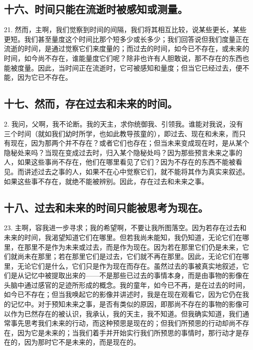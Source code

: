 
\subsection{十六、时间只能在流逝时被感知或测量。}

21. 然而，主啊，我们觉察到时间的间隔，我们将其相互比较，说某些更长，某些更短。我们甚至量度这个时间比那个短多少或长多少；我们回答说但我们度量正在流逝的时间，是通过觉察它们来度量的；而过去的时间，如今已不存在，或未来的时间，如今尚不存在，谁能量度它们呢？除非也许有人胆敢说，那不存在的东西也能被度量。因此，当时间正在流逝时，它可被感知和量度；但当它已经过去，便不能，因为它已不存在。\par


\subsection{十七、然而，存在过去和未来的时间。}

2. 我问，父啊，我不论断。我的天主，求你统御我、引领我。谁能对我说，没有三个时间（就如我们幼时所学，也如此教导孩童的），即过去、现在和未来，而只有现在，因为那两个并不存在？或者它们也存在；但当未来变成现在时，是从某个隐秘处来吗？当现在变成过去时，归入某个隐秘处吗？因为那些预言未来之事的人，如果这些事尚不存在，他们在哪里看见了它们？因为不存在的东西不能被看见。而讲述过去之事的人，如果不在心中觉察它们，就不能将其作为真实来叙述。如果这些事不存在，就绝不能被辨别。因此，存在过去和未来之事。\par


\subsection{十八、过去和未来的时间只能被思考为现在。}

23. 主啊，容我进一步寻求；我的希望啊，不要让我所图落空。因为若存在过去和未来的时间，我渴望知道它们在哪里。但若我尚未能知，我仍知道，无论它们在哪里，在那里不是作为未来或过去，而是作为现在。因为若在那里它们仍是未来，它们就尚未在那里；若在那里它们是过去，它们就不再在那里。因此，无论它们在哪里，无论它们是什么，它们只是作为现在而存在。虽然过去的事被真实地叙述，它们是从记忆中被提取出来的——不是那些已过去的事情本身，而是由事物的影像在头脑中通过感官的足迹所形成的概念。我的童年，如今已不再，是在过去的时间，如今已不存在；但当我唤起它的影像并讲述时，我是在现在观看它，因为它仍在我的记忆中。对于预知未来之事，是否有类似的原因，即那尚不存在的事物的影像可以作为已然存在的被认识，我承认，我的天主，我不知道。但我确实知道，我们通常事先思考我们未来的行动，而这种预思是现在的；但我们所预思的行动却尚不存在，因为它是未来的；当我们着手并开始实行我们所预思的事情时，那行动才是存在的，因为那时它不是未来的，而是现在的。\par

